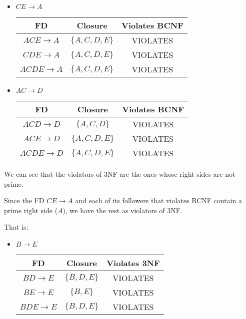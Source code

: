 \documentclass[12pt,letterpaper]{article}
\begin{document}
\begin{enumerate}
\begin{enumerate}
\begin{itemize}
            \item $CE \rightarrow A$

              \begin{tabular}{c | c | c |}
                FD                    & Closure             & Violates BCNF \\
                \hline
                $ACE \rightarrow A$   & $\{A, C, D, E\}$    & VIOLATES \\
                \hline
                $CDE \rightarrow A$   & $\{A, C, D, E\}$    & VIOLATES \\
                \hline
                $ACDE \rightarrow A$  & $\{A, C, D, E\}$    & VIOLATES \\
                \hline
              \end{tabular}

            \item $AC \rightarrow D$

              \begin{tabular}{c | c | c |}
                FD                    & Closure             & Violates BCNF \\
                \hline
                $ACD \rightarrow D$   & $\{A, C, D\}$       & VIOLATES \\
                \hline
                $ACE \rightarrow D$   & $\{A, C, D, E\}$    & VIOLATES \\
                \hline
                $ACDE \rightarrow D$  & $\{A, C, D, E\}$    & VIOLATES \\
                \hline
              \end{tabular}
          \end{itemize}

          We can see that the violators of 3NF are the ones whose right sides are not prime.

          Since the FD $CE \rightarrow A$ and each of its followers that violates BCNF contain a prime right side ($A$),
          we have the rest as violators of 3NF.

          That is:

          \begin{itemize}
            \item $B \rightarrow E$

              \begin{tabular}{c | c | c |}
                FD                    & Closure             & Violates 3NF \\
                \hline
                $BD \rightarrow E$    & $\{B, D, E\}$       & VIOLATES \\
                \hline
                $BE \rightarrow E$    & $\{B, E\}$          & VIOLATES \\
                \hline
                $BDE \rightarrow E$   & $\{B, D, E\}$       & VIOLATES \\
                \hline
              \end{tabular}


\end{itemize}
\end{enumerate}
\end{enumerate}
\end{document}
